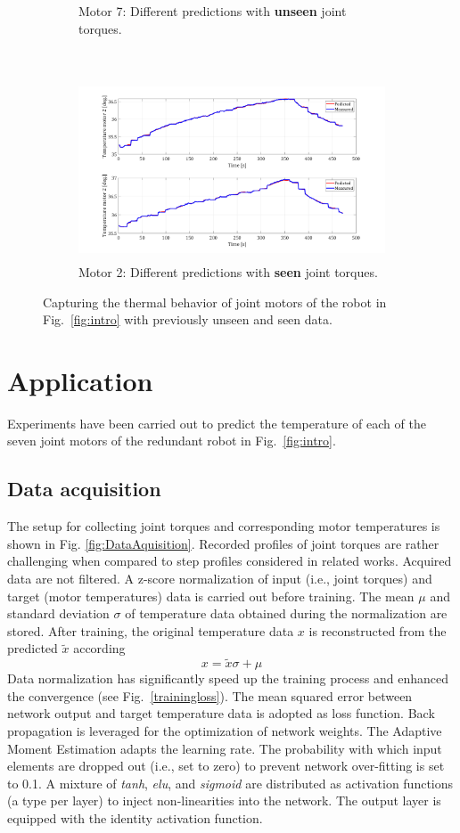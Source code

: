\documentclass{ifacconf}
\begin{document}
\begin{figure}[t!]
\begin{subfigure}[t]{\columnwidth}
		\caption{Motor 7: Different predictions with \textbf{unseen} joint torques.}
	\end{subfigure}
	~
	\begin{subfigure}[t]{\columnwidth}
		\includegraphics[height=2.1in]{./pictures/applications/J2.png}
		\caption{Motor 2: Different predictions with \textbf{seen} joint torques.}
	\end{subfigure}
	\caption{Capturing the thermal behavior of joint motors of the robot in Fig.~\ref{fig:intro} with previously unseen and seen data.}
	\label{sevenjoint}
\end{figure}


\section{Application}
Experiments have been carried out to predict the temperature of each of the seven joint motors of the redundant robot in Fig.~\ref{fig:intro}. 

\subsection{Data acquisition}
The setup for collecting joint torques and corresponding motor temperatures is shown in Fig. \ref{fig:DataAquisition}. Recorded profiles of joint torques are rather challenging when compared to step profiles considered in related works.  Acquired data are not filtered. A z-score normalization of  input (i.e., joint torques) and target (motor temperatures) data is carried out before training. The  mean $\mu$ and standard deviation $\sigma$ of temperature data obtained during the normalization are stored. After training, the original temperature data $x$ is reconstructed from the predicted $\tilde{x}$ according
\begin{equation}
	x=\tilde{x}\sigma +\mu
\end{equation}
Data normalization has significantly speed up the training process and enhanced the convergence (see Fig.~\ref{trainingloss}). The mean squared error between network output and target temperature data  is adopted as loss function. Back propagation is leveraged for the optimization of network weights. The Adaptive Moment {Estimation adapts the learning rate.} The probability with which input elements are dropped out (i.e., set to zero) to prevent  network over-fitting is set to 0.1. A mixture of \textit{tanh}, \textit{elu}, and \textit{sigmoid} are distributed as activation functions (a type per layer) to inject non-linearities  into the network. The output layer is equipped {with the identity activation function.}
\end{document}
